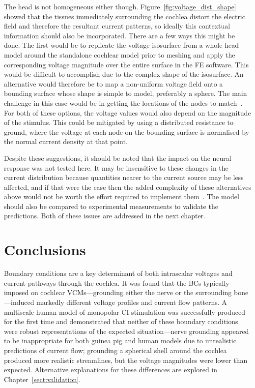 
The head is not homogeneous either though. Figure~\ref{fig:voltage_dist_shape}
showed that the tissues immediately surrounding the cochlea distort the electric
field and therefore the resultant current patterns, so ideally this contextual
information should also be incorporated. There are a few ways this might be
done. The first would be to replicate the voltage isosurface from a whole head
model around the standalone cochlear model prior to meshing and apply the
corresponding voltage magnitude over the entire surface in the FE software. This
would be difficult to accomplish due to the complex shape of the isosurface. An
alternative would therefore be to map a non-uniform voltage field onto a
bounding surface whose shape is simple to model, preferably a sphere. The main
challenge in this case would be in getting the locations of the nodes to
match~\cite{wong2013ciap}. For both of these options, the voltage values would
also depend on the magnitude of the stimulus. This could be mitigated by using a
distributed resistance to ground, where the voltage at each node on the
bounding surface is normalised by the normal current density at that point.

Despite these suggestions, it should be noted that the impact on the neural
response was not tested here. It may be insensitive to these changes in the
current distribution because quantities nearer to the current source may be less
affected, and if that were the case then the added complexity of these
alternatives above would not be worth the effort required to implement
them~\cite{bondeson2005}. The model should also be compared to experimental
measurements to validate the predictions. Both of these issues are addressed in
the next chapter.

\section{Conclusions}

Boundary conditions are a key determinant of both intrascalar voltages and
current pathways through the cochlea. It was found that the BCs typically
imposed on cochlear VCMs---grounding either the nerve or the surrounding
bone---induced markedly different voltage profiles and current flow patterns.
A multiscale human model of monopolar CI stimulation was successfully produced
for the first time and demonstrated that neither of these boundary conditions
were robust representations of the expected \invivo{} situation---nerve
grounding appeared to be inappropriate for both guinea pig and human models due
to unrealistic predictions of current flow; grounding a spherical shell around
the cochlea produced more realistic streamlines, but the voltage magnitudes were
lower than expected. Alternative explanations for these differences are explored
in Chapter~\ref{sect:validation}.

